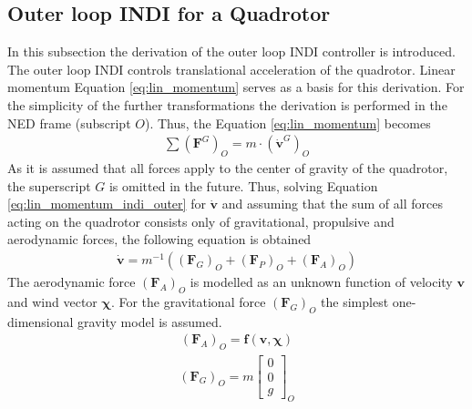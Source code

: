 \documentclass[11pt, a4paper, twoside]{report}
\begin{document}
\subsection{Outer loop INDI for a Quadrotor} \label{subsec: indi_outer}

In this subsection the derivation of the outer loop \acrshort{INDI} controller is introduced. The outer loop \acrshort{INDI} controls translational acceleration of the quadrotor. Linear momentum Equation \ref{eq:lin_momentum} serves as a basis for this derivation. For the simplicity of the further transformations the derivation is performed in the \acrshort{NED} frame (subscript $O$). Thus, the Equation \ref{eq:lin_momentum} becomes
\begin{equation}
	\begin{split}
		\sum (\bm{F}^G)_O = m \cdot (\bm{\dot{v}}^G)_{O}
		\label{eq:lin_momentum_indi_outer}
	\end{split}
\end{equation}
As it is assumed that all forces apply to the center of gravity of the quadrotor, the superscript $G$ is omitted in the future. Thus, solving Equation \ref{eq:lin_momentum_indi_outer} for $\bm{\dot{v}}$ and assuming that the sum of all forces acting on the quadrotor consists only of gravitational, propulsive and aerodynamic forces, the following equation is obtained
\begin{equation}
	\begin{split}
		\bm{\dot{v}} = m^{-1} ((\bm{F}_G)_O + (\bm{F}_P)_O+ (\bm{F}_A)_O)
		\label{eq:lin_momentum_indi_outer_simple}
	\end{split}
\end{equation}
The aerodynamic force $(\bm{F}_A)_O$ is modelled as an unknown function of velocity $\bm{v}$ and wind vector $\bm{\chi}$. For the gravitational force $(\bm{F}_G)_O$ the simplest one-dimensional gravity model is assumed.
\begin{equation}
	\begin{split}
		(\bm{F}_A)_O = \bm{f}(\bm{v}, \bm{\chi})
		\label{eq:Fa}
	\end{split}
\end{equation}
\begin{equation}
	\begin{split}
		(\bm{F}_G)_O = m 
		\begin{bmatrix}
			0\\
			0\\
			g
		\end{bmatrix}_O
		\label{eq:Fg}
	\end{split}
\end{equation}
\end{document}
